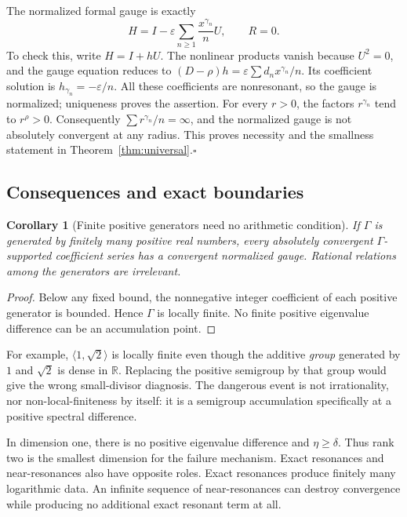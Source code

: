 \documentclass[11pt,a4paper]{article}
\numberwithin{equation}{section}
\newtheorem{corollary}[theorem]{Corollary}
\theoremstyle{definition}
\theoremstyle{remark}
\newcommand{\R}{\mathbb R}
\newcommand{\G}{\Gamma}
\begin{document}
The normalized formal gauge is exactly
\begin{equation}\label{eq:counter-H}
 H=I-\varepsilon\sum_{n\geq1}\frac{x^{\gamma_n}}nU,
 \qquad R=0.
\end{equation}
To check this, write $H=I+hU$. The nonlinear products vanish because
$U^2=0$, and the gauge equation reduces to
$(D-\rho)h=\varepsilon\sum d_nx^{\gamma_n}/n$. Its coefficient
solution is $h_{\gamma_n}=-\varepsilon/n$. All these coefficients are
nonresonant, so the gauge is normalized; uniqueness proves the assertion.
For every $r>0$, the factors $r^{\gamma_n}$ tend to $r^\rho>0$.
Consequently
$\sum r^{\gamma_n}/n=\infty$, and the normalized gauge is not
absolutely convergent at any radius. This proves necessity and the
smallness statement in Theorem~\ref{thm:universal}.\hfill$\square$

\subsection{Consequences and exact boundaries}
\begin{corollary}[Finite positive generators need no arithmetic condition]
\label{cor:finite-grid}
If $\G$ is generated by finitely many positive real numbers, every
absolutely convergent $\G$-supported coefficient series has a convergent
normalized gauge. Rational relations among the generators are irrelevant.
\end{corollary}
\begin{proof}
Below any fixed bound, the nonnegative integer coefficient of each positive
generator is bounded. Hence $\G$ is locally finite. No finite positive
eigenvalue difference can be an accumulation point.
\end{proof}

For example, $\langle1,\sqrt2\rangle$ is locally finite even though the
additive \emph{group} generated by $1$ and $\sqrt2$ is dense in $\R$.
Replacing the positive semigroup by that group would give the wrong
small-divisor diagnosis. The dangerous event is not irrationality, nor
non-local-finiteness by itself: it is a semigroup accumulation specifically
at a positive spectral difference.

In dimension one, there is no positive eigenvalue difference and
$\eta\geq\delta$. Thus rank two is the smallest dimension for the
failure mechanism. Exact resonances and near-resonances also have opposite
roles. Exact resonances produce finitely many logarithmic data. An infinite
sequence of near-resonances can destroy convergence while producing no
additional exact resonant term at all.
\end{document}
